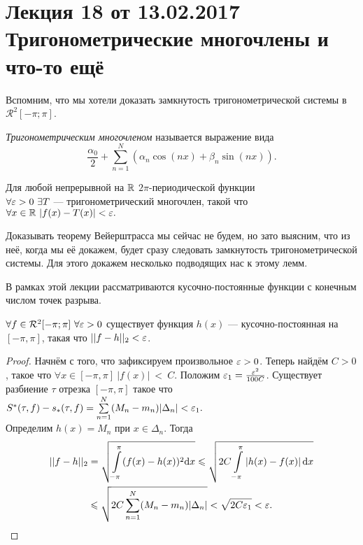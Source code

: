 \section{Лекция 18 от 13.02.2017 \\ Тригонометрические многочлены и что-то ещё}
Вспомним, что мы хотели доказать замкнутость тригонометрической системы в $\mathcal{R}^2[-\pi;\pi]$.
\begin{Def}
\textit{Тригонометрическим многочленом} называется выражение вида
$$
\frac{\alpha_0}{2} + \sum\limits_{n = 1}^N\left(\alpha_n \cos(nx) +\beta_n \sin(nx)\right).
$$
\end{Def}
\begin{Theorem}[Вейерштрасса]
    Для любой непрерывной на $\mathbb{R}$ $2\pi$-периодической функции \\$\forall \varepsilon>0\  \exists T$ --- тригонометрический многочлен, такой что $\forall x \in \mathbb{R} \ |f(x)-T(x)|<\varepsilon.$
\end{Theorem}
Доказывать теорему Вейерштрасса мы сейчас не будем, но зато выясним, что из неё, когда мы её докажем, будет сразу следовать замкнутость тригонометрической системы. Для этого докажем несколько подводящих нас к этому лемм.
\begin{Comment}
    В рамках этой лекции рассматриваются кусочно-постоянные функции с конечным числом точек разрыва.
\end{Comment}
\begin{Lemma}
   $\forall f \in \mathcal{R}^2[-\pi;\pi]\ \forall \eps > 0$ существует функция $ h(x)$ --- кусочно-постоянная на $[-\pi, \pi]$, такая что $||f-h||_2 < \varepsilon$.
\end{Lemma}
\begin{proof}
    Начнём с того, что зафиксируем произвольное $\varepsilon >0$. Теперь найдём $C>0$, такое что $\forall x \in [-\pi, \pi]\ |f(x)|~<~C$. Положим $\varepsilon_1 = \frac{\varepsilon^2}{100C}$. Существует разбиение  $\tau$ отрезка $[-\pi, \pi]$ такое что $S^*(\tau, f)- s_*(\tau, f) = \sum\limits_{n=1}^N (M_n-m_n)|\Delta_n|< \varepsilon_1.$\\
    Определим $h(x) = M_n$ при $x \in \Delta_n$. Тогда 
     \begin{multline} ||f-h||_2 = \sqrt{\int\limits_{-\pi}^{\pi}(f(x)-h(x))^2\mathrm{d}x} \leqslant \sqrt{2C\int\limits_{-\pi}^{\pi}\left| h(x)-f(x)\right| \mathrm{d}x}\\ \leqslant \sqrt{2C\sum\limits_{n=1}^N (M_n-m_n)|\Delta_n|} < \sqrt{2C\varepsilon_1} < \varepsilon. \end{multline}
\end{proof}

